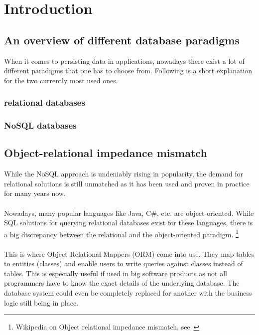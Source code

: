 \section{Introduction}\label{einleitung}

\subsection{An overview of different database paradigms}

When it comes to persisting data in applications, nowadays there exist a lot of different
paradigms that one has to choose from. Following is a short explanation for the two currently most used ones.

\subsubsection{relational databases}

\subsubsection{NoSQL databases}

\subsection{Object-relational impedance mismatch}

While the NoSQL approach is undeniably rising in popularity, the demand for
relational solutions is still unmatched as it has been used and proven in practice
for many years now.
\\\\
Nowadays, many popular languages like Java, C\#, etc. are object-oriented.
While SQL solutions for querying relational databases exist for these languages, there is a big
discrepancy between the relational and the object-oriented paradigm. \footnote{Wikipedia on Object relational impedance mismatch, see~\cite{wiki_object_mismatch}}
\\\\
This is where Object Relational Mappers (ORM) come into use. They map tables to entities (classes) and
enable users to write queries against classes instead of tables. This is especially useful if used
in big software products as not all programmers have to know the exact details of the underlying database. The database system could even be completely replaced for another with the business logic still being in place.

